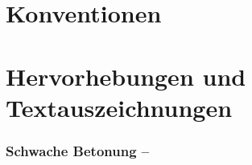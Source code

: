 \documentclass[ngerman,paper=a4,fontsize=8pt,headings=small,draft=no,parskip=half,noonelinecaption]{scrreprt}
\begin{document}
\section{Konventionen}






\section{Hervorhebungen und Textauszeichnungen}





% 
% 
% 







\subsubsection{Schwache Betonung -- }
\end{document}
